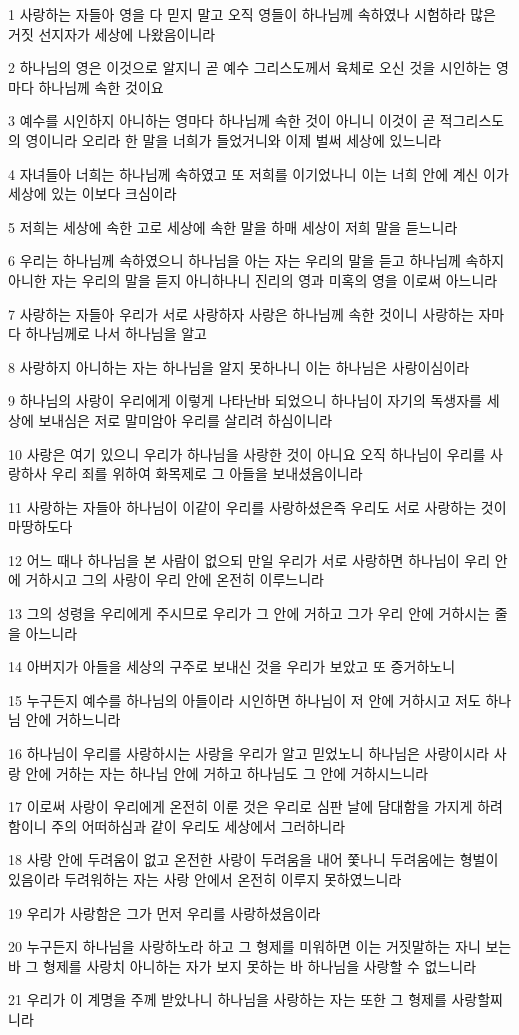\par 1 사랑하는 자들아 영을 다 믿지 말고 오직 영들이 하나님께 속하였나 시험하라 많은 거짓 선지자가 세상에 나왔음이니라
\par 2 하나님의 영은 이것으로 알지니 곧 예수 그리스도께서 육체로 오신 것을 시인하는 영마다 하나님께 속한 것이요
\par 3 예수를 시인하지 아니하는 영마다 하나님께 속한 것이 아니니 이것이 곧 적그리스도의 영이니라 오리라 한 말을 너희가 들었거니와 이제 벌써 세상에 있느니라
\par 4 자녀들아 너희는 하나님께 속하였고 또 저희를 이기었나니 이는 너희 안에 계신 이가 세상에 있는 이보다 크심이라
\par 5 저희는 세상에 속한 고로 세상에 속한 말을 하매 세상이 저희 말을 듣느니라
\par 6 우리는 하나님께 속하였으니 하나님을 아는 자는 우리의 말을 듣고 하나님께 속하지 아니한 자는 우리의 말을 듣지 아니하나니 진리의 영과 미혹의 영을 이로써 아느니라
\par 7 사랑하는 자들아 우리가 서로 사랑하자 사랑은 하나님께 속한 것이니 사랑하는 자마다 하나님께로 나서 하나님을 알고
\par 8 사랑하지 아니하는 자는 하나님을 알지 못하나니 이는 하나님은 사랑이심이라
\par 9 하나님의 사랑이 우리에게 이렇게 나타난바 되었으니 하나님이 자기의 독생자를 세상에 보내심은 저로 말미암아 우리를 살리려 하심이니라
\par 10 사랑은 여기 있으니 우리가 하나님을 사랑한 것이 아니요 오직 하나님이 우리를 사랑하사 우리 죄를 위하여 화목제로 그 아들을 보내셨음이니라
\par 11 사랑하는 자들아 하나님이 이같이 우리를 사랑하셨은즉 우리도 서로 사랑하는 것이 마땅하도다
\par 12 어느 때나 하나님을 본 사람이 없으되 만일 우리가 서로 사랑하면 하나님이 우리 안에 거하시고 그의 사랑이 우리 안에 온전히 이루느니라
\par 13 그의 성령을 우리에게 주시므로 우리가 그 안에 거하고 그가 우리 안에 거하시는 줄을 아느니라
\par 14 아버지가 아들을 세상의 구주로 보내신 것을 우리가 보았고 또 증거하노니
\par 15 누구든지 예수를 하나님의 아들이라 시인하면 하나님이 저 안에 거하시고 저도 하나님 안에 거하느니라
\par 16 하나님이 우리를 사랑하시는 사랑을 우리가 알고 믿었노니 하나님은 사랑이시라 사랑 안에 거하는 자는 하나님 안에 거하고 하나님도 그 안에 거하시느니라
\par 17 이로써 사랑이 우리에게 온전히 이룬 것은 우리로 심판 날에 담대함을 가지게 하려 함이니 주의 어떠하심과 같이 우리도 세상에서 그러하니라
\par 18 사랑 안에 두려움이 없고 온전한 사랑이 두려움을 내어 쫓나니 두려움에는 형벌이 있음이라 두려워하는 자는 사랑 안에서 온전히 이루지 못하였느니라
\par 19 우리가 사랑함은 그가 먼저 우리를 사랑하셨음이라
\par 20 누구든지 하나님을 사랑하노라 하고 그 형제를 미워하면 이는 거짓말하는 자니 보는 바 그 형제를 사랑치 아니하는 자가 보지 못하는 바 하나님을 사랑할 수 없느니라
\par 21 우리가 이 계명을 주께 받았나니 하나님을 사랑하는 자는 또한 그 형제를 사랑할찌니라

